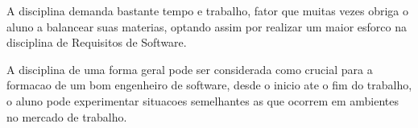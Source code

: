 A disciplina demanda bastante tempo e trabalho, fator que muitas vezes obriga o aluno
a balancear suas materias, optando assim por realizar um maior esforco na disciplina
de Requisitos de Software.

A disciplina de uma forma geral pode ser considerada como crucial para a formacao
de um bom engenheiro de software, desde o inicio ate o fim do trabalho, o aluno pode
experimentar situacoes semelhantes as que ocorrem em ambientes no mercado de trabalho.
